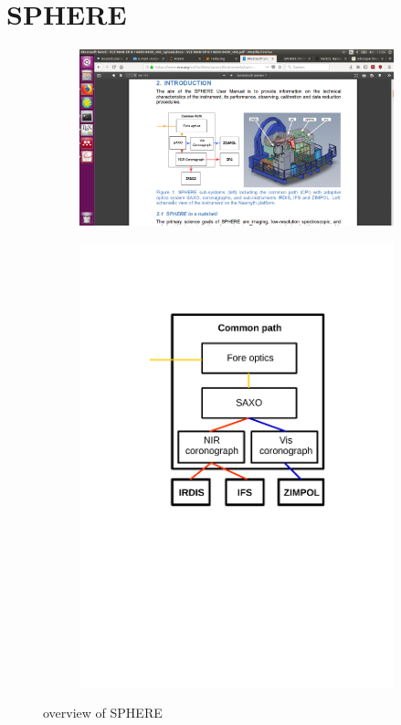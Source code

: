 \documentclass[twoside,single]{lion-msc}
\begin{document}
\section{SPHERE}
\begin{figure}[hb]
\centering
\begin{subfigure}{.6\textwidth}
  \centering
  \includegraphics[trim={25cm 6cm 7cm 8.8cm},clip,width = 1\linewidth]{overviewSPHERE}
  \caption{\citep{Observatory2007}}
\end{subfigure}%
\begin{subfigure}{.4\textwidth}
  \centering
  \includegraphics[trim={5cm 12cm 3.5cm 3.5cm},clip,width=1\linewidth]{overview_SPHERE}
  \caption{}
\end{subfigure}
\caption{overview of SPHERE}
\label{fig:overviewSPHERE}
\end{figure}
\end{document}

